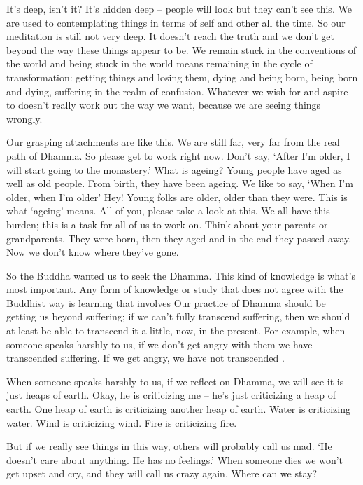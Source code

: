 It's deep, isn't it? It's hidden deep -- people will look but they can't see this. We are used to contemplating things in terms of self and other all the time. So our meditation is still not very deep. It doesn't reach the truth and we don't get beyond the way these things appear to be. We remain stuck in the conventions of the world and being stuck in the world means remaining in the cycle of transformation: getting things and losing them, dying and being born, being born and dying, suffering in the realm of confusion. Whatever we wish for and aspire to doesn't really work out the way we want, because we are seeing things wrongly. 

Our grasping attachments are like this. We are still far, very far from the real path of Dhamma. So please get to work right now. Don't say, `After I'm older, I will start going to the monastery.' What is ageing? Young people have aged as well as old people. From birth, they have been ageing. We like to say, `When I'm older, when I'm older' Hey! Young folks are older, older than they were. This is what `ageing' means. All of you, please take a look at this. We all have this burden; this is a task for all of us to work on. Think about your parents or grandparents. They were born, then they aged and in the end they passed away. Now we don't know where they've gone. 

So the Buddha wanted us to seek the Dhamma. This kind of knowledge is what's most important. Any form of knowledge or study that does not agree with the Buddhist way is learning that involves  Our practice of Dhamma should be getting us beyond suffering; if we can't fully transcend suffering, then we should at least be able to transcend it a little, now, in the present. For example, when someone speaks harshly to us, if we don't get angry with them we have transcended suffering. If we get angry, we have not transcended . 

When someone speaks harshly to us, if we reflect on Dhamma, we will see it is just heaps of earth. Okay, he is criticizing me -- he's just criticizing a heap of earth. One heap of earth is criticizing another heap of earth. Water is criticizing water. Wind is criticizing wind. Fire is criticizing fire. 

But if we really see things in this way, others will probably call us mad. `He doesn't care about anything. He has no feelings.' When someone dies we won't get upset and cry, and they will call us crazy again. Where can we stay? 

